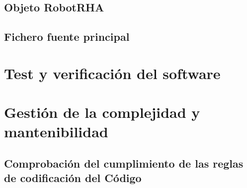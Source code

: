     \subsection{Objeto RobotRHA} \label{subsec:SW:robotrha}
    \subsection{Fichero fuente principal} \label{subsec:SW:maincpp}

\section{Test y verificación del software} \label{sec:SW:test}

\section{Gestión de la complejidad y mantenibilidad} \label{sec:SW:gestion_complejidad}

    \subsection{Comprobación del cumplimiento de las reglas de codificación del Código}
